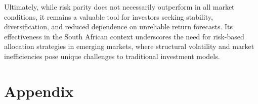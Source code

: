 \documentclass[preprint, 3p,
authoryear]{elsarticle} %
\begin{document}
Ultimately, while risk parity does not necessarily outperform in all
market conditions, it remains a valuable tool for investors seeking
stability, diversification, and reduced dependence on unreliable return
forecasts. Its effectiveness in the South African context underscores
the need for risk-based allocation strategies in emerging markets, where
structural volatility and market inefficiencies pose unique challenges
to traditional investment models.

\hypertarget{appendix}{%
\section{Appendix}\label{appendix}}

\newpage

\renewcommand\refname{References}

\end{document}
